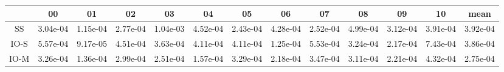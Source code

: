\begin{tabular}{|c|c|c|c|c|c|c|c|c|c|c|c|c|}
\hline
 & 00 & 01 & 02 & 03 & 04 & 05 & 06 & 07 & 08 & 09 & 10 & mean \\
\hline
SS & 3.04e-04 & 1.15e-04 & 2.77e-04 & 1.04e-03 & 4.52e-04 & 2.43e-04 & 4.28e-04 & 2.52e-04 & 4.99e-04 & 3.12e-04 & 3.91e-04 & 3.92e-04 \\
\hline
IO-S & 5.57e-04 & 9.17e-05 & 4.51e-04 & 3.63e-04 & 4.11e-04 & 4.11e-04 & 1.25e-04 & 5.53e-04 & 3.24e-04 & 2.17e-04 & 7.43e-04 & 3.86e-04 \\
\hline
IO-M & 3.26e-04 & 1.36e-04 & 2.99e-04 & 2.51e-04 & 1.57e-04 & 3.29e-04 & 2.18e-04 & 3.47e-04 & 3.11e-04 & 2.21e-04 & 4.32e-04 & 2.75e-04 \\
\hline
\end{tabular}